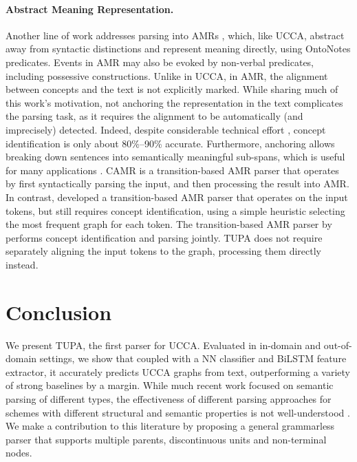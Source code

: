 \documentclass[11pt,a4paper]{article}
\newcommand{\parser}[1]{TUPA\textsubscript{#1}}
\begin{document}
\paragraph{Abstract Meaning Representation.}
Another line of work addresses parsing into AMRs
\cite{flanigan2014discriminative,vanderwende2015amr,pust2015parsing,artzi2015broad},
which, like UCCA, abstract away from syntactic distinctions
and represent meaning directly, using OntoNotes predicates.
Events in AMR may also be evoked by non-verbal predicates, including possessive constructions.
Unlike in UCCA, in AMR, the alignment between concepts and the text is not explicitly marked.
While sharing much of this work's motivation, not anchoring the representation in the text
complicates the parsing task, as it requires
the alignment to be automatically (and imprecisely) detected.
Indeed, despite considerable technical effort
\cite{flanigan2014discriminative,pourdamghani2014aligning,werling2015robust},
concept identification is only about 80\%--90\% accurate.
Furthermore, anchoring allows breaking down sentences into semantically meaningful sub-spans,
which is useful for many applications \cite{fernandez2015parsing,birch2016hume}.
CAMR \cite{wang-xue-pradhan:2015:ACL-IJCNLP,wang2015transition,wang-EtAl:2016:SemEval,goodman2016noise}
is a transition-based AMR parser that operates by first syntactically parsing the input,
and then processing the result into AMR.
In contrast,
\citet{damonte-17} developed a transition-based AMR parser that
operates on the input tokens, but still requires concept identification, using
a simple heuristic selecting the most frequent graph for each token.
The transition-based AMR parser by \citet{zhou2016amr} performs concept identification
and parsing jointly.
\parser{} does not require separately aligning the input tokens to the graph,
processing them directly instead.



\section{Conclusion}\label{sec:conclusion}

We present \parser{}, the first parser for UCCA.
Evaluated in in-domain and out-of-domain settings, we show that coupled with a
NN classifier and BiLSTM feature extractor,
it accurately predicts UCCA graphs from text, outperforming a variety of
strong baselines by a margin.
While much recent work focused on semantic parsing of different types,
the effectiveness of different parsing approaches for schemes with
different structural and semantic properties is not well-understood
\cite{kuhlmann2016towards}.
We make a contribution to this literature by proposing a general grammarless parser
that supports multiple parents, discontinuous units and non-terminal nodes.
\end{document}
